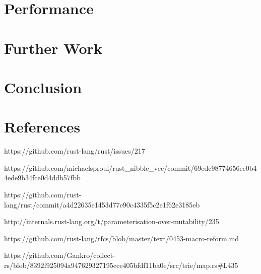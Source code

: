 \documentclass[a4paper,12pt]{article}
\begin{document}
\section{Performance}

\section{Further Work}

\section{Conclusion}

\section{References}

https://github.com/rust-lang/rust/issues/217

https://github.com/michaelsproul/rust\_nibble\_vec/commit/69edc98774656ec0b44ede9b34fce0d4ddb57fbb

https://github.com/rust-lang/rust/commit/a4d22635e1453d77e90c4335f5c2e1f62e3185eb

http://internals.rust-lang.org/t/parameterisation-over-mutability/235

https://github.com/rust-lang/rfcs/blob/master/text/0453-macro-reform.md

https://github.com/Gankro/collect-rs/blob/8392f925094a947629327195cce405bfdf11ba0e/src/trie/map.rs\#L435
\end{document}
